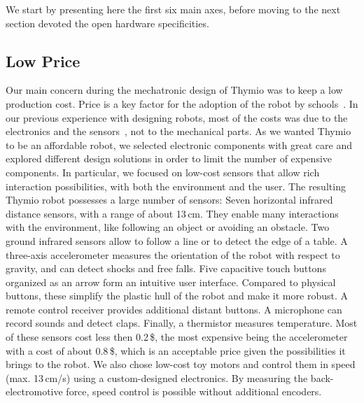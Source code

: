 \documentclass[letterpaper, 10 pt, conference]{ieeeconf}  %
\begin{document}
We start by presenting here the first six main axes, before moving to the next section devoted the open hardware specificities.

\subsection{Low Price}

Our main concern during the mechatronic design of Thymio was to keep a low production cost. 
Price is a key factor for the adoption of the robot by schools~\cite{kradolfer2014sociological}.
In our previous experience with designing robots, most of the costs was due to the electronics and the sensors~\cite{thesis_michael}, not to the mechanical parts.
As we wanted Thymio to be an affordable robot, we selected electronic components with great care and explored different design solutions in order to limit the number of expensive components.
In particular, we focused on low-cost sensors that allow rich interaction possibilities, with both the environment and the user.
The resulting Thymio robot possesses a large number of sensors:
Seven horizontal infrared distance sensors, with a range of about 13\,cm.
They enable many interactions with the environment, like following an object or avoiding an obstacle.
Two ground infrared sensors allow to follow a line or to detect the edge of a table.
A three-axis accelerometer measures the orientation of the robot with respect to gravity, and can detect shocks and free falls.
Five capacitive touch buttons organized as an arrow form an intuitive user interface.
Compared to physical buttons, these simplify the plastic hull of the robot and make it more robust.
A remote control receiver provides additional distant buttons.
A microphone can record sounds and detect claps. 
Finally, a thermistor measures temperature.
Most of these sensors cost less then 0.2\,\$, the most expensive being the accelerometer with a cost of about 0.8\,\$, which is an acceptable price given the possibilities it brings to the robot.
We also chose low-cost toy motors and control them in speed (max. 13\,cm/s) using a custom-designed electronics.
By measuring the back-electromotive force, speed control is possible without additional encoders.
\end{document}
